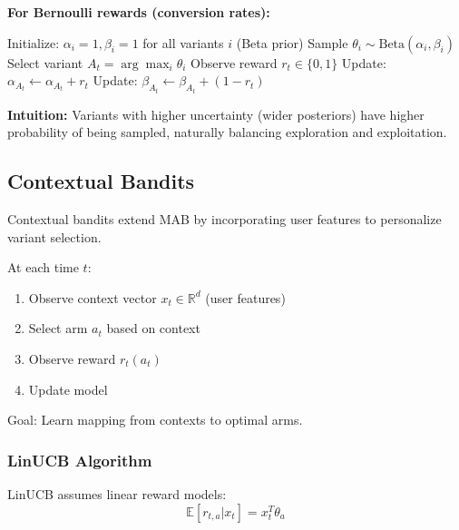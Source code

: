 \textbf{For Bernoulli rewards (conversion rates):}

\begin{algorithm}[H]
\caption{Thompson Sampling for Bernoulli Bandits}
\begin{algorithmic}
\STATE Initialize: $\alpha_i = 1, \beta_i = 1$ for all variants $i$ (Beta prior)
        \STATE Sample $\theta_i \sim \text{Beta}(\alpha_i, \beta_i)$
    \ENDFOR
    \STATE Select variant $A_t = \arg\max_i \theta_i$
    \STATE Observe reward $r_t \in \{0, 1\}$
    \STATE Update: $\alpha_{A_t} \leftarrow \alpha_{A_t} + r_t$
    \STATE Update: $\beta_{A_t} \leftarrow \beta_{A_t} + (1 - r_t)$
\ENDFOR
\end{algorithmic}
\end{algorithm}

\textbf{Intuition:} Variants with higher uncertainty (wider posteriors) have higher probability of being sampled, naturally balancing exploration and exploitation.

\subsection{Contextual Bandits}

Contextual bandits extend MAB by incorporating user features to personalize variant selection.

\begin{definition}
At each time $t$:
\begin{enumerate}
    \item Observe context vector $x_t \in \mathbb{R}^d$ (user features)
    \item Select arm $a_t$ based on context
    \item Observe reward $r_t(a_t)$
    \item Update model
\end{enumerate}

Goal: Learn mapping from contexts to optimal arms.
\end{definition}

\subsubsection{LinUCB Algorithm}

LinUCB assumes linear reward models:
\begin{equation}
\mathbb{E}[r_{t,a} | x_t] = x_t^T \theta_a
\end{equation}

